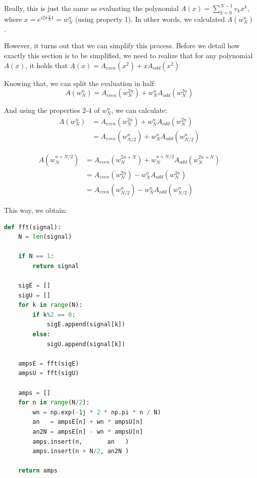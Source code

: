 Really, this is just the same as evaluating the polynomial $A(x) = \sum_{k=0}^{N-1} v_k x^k$, where $x = e^{i 2 \pi \frac{n}{N} 1} = w_N^n$ (using property 1). In other words, we calculated $A(w_N^n)$.

However, it turns out that we can simplify this process. Before we detail how exactly this section is to be simplified, we need to realize that for any polynomial $A(x)$, it holds that $A(x) = A_{even}(x^2) + x A_{odd}(x^2)$


Knowing that, we can split the evaluation in half:
$$ A(w_N^n) = A_{even}(w_N^{2n}) + w_N^n A_{odd}(w_N^{2n})$$


And using the properties 2-4 of $w_N^n$, we can calculate:
\begin{equation} 
\begin{split} 
    A(w_N^n) & = A_{even}(w_N^{2n})   + w_N^n A_{odd}(w_N^{2n})   \\
             & = A_{even}(w_{N/2}^n)  + w_N^n A_{odd}(w_{N/2}^n)
\end{split}
\end{equation}

\begin{equation} 
\begin{split}  
A(w_N^{n + N/2})  & = A_{even}(w_N^{2n+ N}) + w_N^{n+N/2} A_{odd}(w_N^{2n + N}) \\
                  & = A_{even}(w_N^{2n}) - w_N^n A_{odd}(w_N^{2n})   \\
                  & = A_{even}(w_{N/2}^n) - w_N^n A_{odd}(w_{N/2}^n)
\end{split}
\end{equation}

This way, we obtain:
\begin{lstlisting}[language=python]
def fft(signal):
    N = len(signal)

    if N == 1:
        return signal

    sigE = []
    sigU = []
    for k in range(N):
        if k%2 == 0:
            sigE.append(signal[k])
        else:
            sigU.append(signal[k])

    ampsE = fft(sigE)
    ampsU = fft(sigU)

    amps = []
    for n in range(N/2):
        wn = np.exp(-1j * 2 * np.pi * n / N)
        an   = ampsE[n] + wn * ampsU[n]
        an2N = ampsE[n] - wn * ampsU[n]
        amps.insert(n,       an   )
        amps.insert(n + N/2, an2N )

    return amps
\end{lstlisting}

